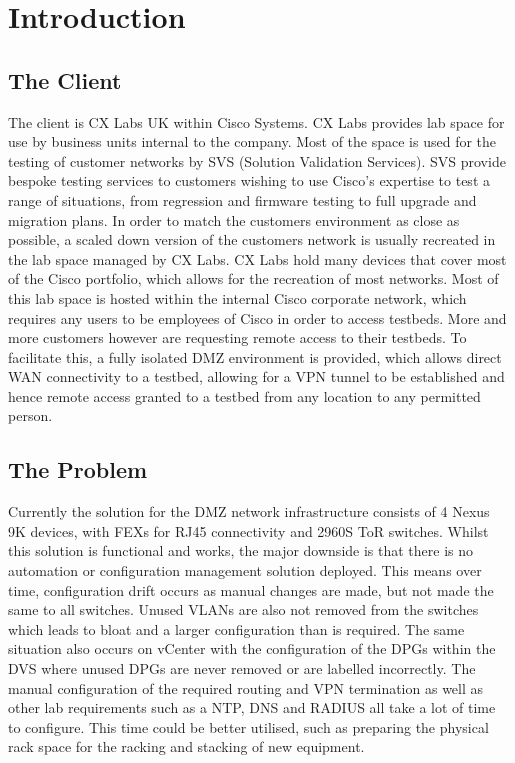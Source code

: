 \chapter{Introduction}
\label{chap:intro}

\section{The Client}
\label{intro:client}

The client is CX Labs UK within Cisco Systems. CX Labs provides lab space for
use by business units internal to the company. Most of the space is used for
the testing of customer networks by SVS (Solution Validation Services). SVS
provide bespoke testing services to customers wishing to use Cisco’s expertise
to test a range of situations, from regression and firmware testing to full
upgrade and migration plans.\newline
In order to match the customers environment as close as possible, a scaled down
version of the customers network is usually recreated in the lab space managed
by CX Labs. CX Labs hold many devices that cover most of the Cisco portfolio,
which allows for the recreation of most networks. Most of this lab space is
hosted within the internal Cisco corporate network, which requires any users to
be employees of Cisco in order to access testbeds. More and more customers
however are requesting remote access to their testbeds. To facilitate this, a
fully isolated DMZ environment is provided, which allows direct WAN
connectivity to a testbed, allowing for a VPN tunnel to be established and
hence remote access granted to a testbed from any location to any permitted
person.

\section{The Problem}
\label{intro:problem}

Currently the solution for the DMZ network infrastructure consists of 4 Nexus
9K devices, with FEXs for RJ45 connectivity and 2960S ToR switches. Whilst this
solution is functional and works, the major downside is that there is no
automation or configuration management solution deployed. This means over time,
configuration drift occurs as manual changes are made, but not made the same to
all switches. Unused VLANs are also not removed from the switches which leads
to bloat and a larger configuration than is required. The same situation also
occurs on vCenter with the configuration of the DPGs within the DVS where
unused DPGs are never removed or are labelled incorrectly.\newline
The manual configuration of the required routing and VPN termination as well as
other lab requirements such as a NTP, DNS and RADIUS all take a lot of time to
configure. This time could be better utilised, such as preparing the physical
rack space for the racking and stacking of new equipment.
